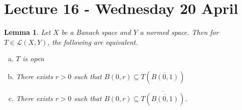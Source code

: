 \documentclass[10pt, oneside, reqno]{amsart}
\theoremstyle{plain}%
\newtheorem{lem}[thm]{Lemma}
\theoremstyle{definition}
\theoremstyle{remark}
\begin{document}
\section{Lecture 16 - Wednesday 20 April} %
\label{sec:lecture_16_wednesday_20_april}


\begin{lem}
    Let $X$ be a Banach space and $Y$ a normed space.  Then for $T \in \mathcal L(X, Y)$, the following are equivalent.
    \begin{enumerate}[(a)]
        \item $T$ is open
        \item There exists $r > 0$ such that $B(0, r) \subseteq T(\overline{B(0, 1)})$
        \item There exists $r > 0$ such that $B(0, r) \subseteq \overline{T(\overline{B(0, 1)})}$.
    \end{enumerate} 
\end{lem}
\end{document}
